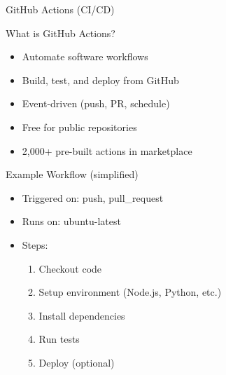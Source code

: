 \documentclass[aspectratio=169]{beamer}
\begin{document}
	\begin{frame}{GitHub Actions (CI/CD)}
		\begin{block}{What is GitHub Actions?}
			\begin{itemize}
				\item Automate software workflows
				\item Build, test, and deploy from GitHub
				\item Event-driven (push, PR, schedule)
				\item Free for public repositories
				\item 2,000+ pre-built actions in marketplace
			\end{itemize}
		\end{block}
		
		\begin{exampleblock}{Example Workflow (simplified)}
			\begin{itemize}
				\item Triggered on: push, pull\_request
				\item Runs on: ubuntu-latest
				\item Steps:
				\begin{enumerate}
					\item Checkout code
					\item Setup environment (Node.js, Python, etc.)
					\item Install dependencies
					\item Run tests
					\item Deploy (optional)
				\end{enumerate}
			\end{itemize}
		\end{exampleblock}
	\end{frame}
	
\end{document}
